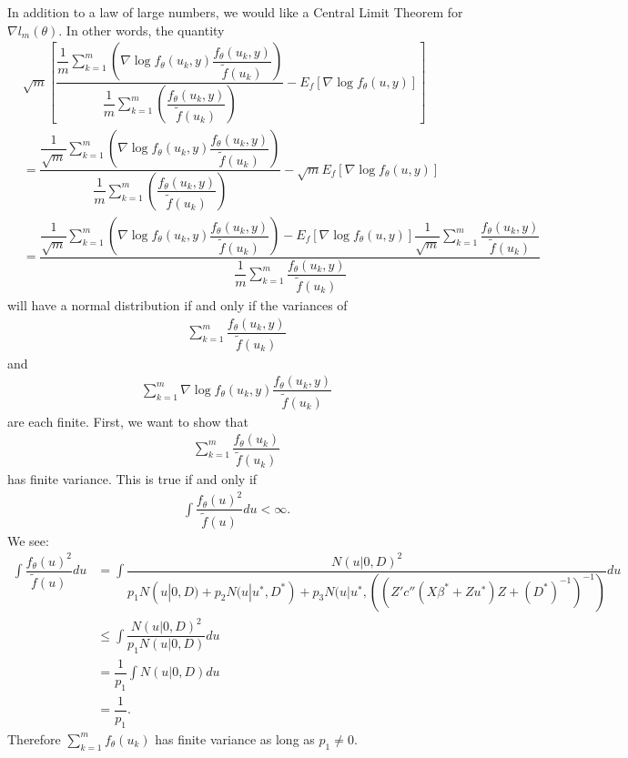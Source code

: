 \documentclass{article}
\begin{document}
In addition to a law of large numbers, we would like a Central Limit Theorem for $\nabla l_m(\theta)$. In other words, the quantity
\begin{align}
&\sqrt{m} \left[  \dfrac{\dfrac{1}{m}\sum_{k=1}^m    \left( \nabla \log f_\theta(u_k,y)   \dfrac{f_\theta(u_k,y)}{\tilde{f}(u_k)} \right)}{\dfrac{1}{m} \sum_{k=1}^m \left( \dfrac{f_\theta(u_k,y)}{\tilde{f}(u_k)} \right) }- E_f \left[ \nabla \log f_\theta(u,y)  \right]  \right] \\
&=
\dfrac{\dfrac{1}{\sqrt{m}}\sum_{k=1}^m    \left( \nabla \log f_\theta(u_k,y)   \dfrac{f_\theta(u_k,y)}{\tilde{f}(u_k)} \right)}{\dfrac{1}{m} \sum_{k=1}^m \left( \dfrac{f_\theta(u_k,y)}{\tilde{f}(u_k)} \right) }- \sqrt{m} E_f \left[ \nabla \log f_\theta(u,y)  \right]  \\
&=\dfrac{\dfrac{1}{\sqrt{m}}\sum_{k=1}^m    \left( \nabla \log f_\theta(u_k,y)\dfrac{f_\theta(u_k,y)}{\tilde{f}(u_k)} \right)
 - E_f \left[ \nabla \log f_\theta(u,y)  \right] \dfrac{1}{\sqrt{m}}\sum_{k=1}^m  \dfrac{f_\theta(u_k,y)}{\tilde{f}(u_k)} }{\dfrac{1}{m} \sum_{k=1}^m  \dfrac{f_\theta(u_k,y)}{\tilde{f}(u_k)} }   
\end{align}
will have a normal distribution if and only if the variances of
\begin{align}
\sum_{k=1}^m  \dfrac{f_\theta(u_k,y)}{\tilde{f}(u_k)}
\end{align}
and
\begin{align}
\sum_{k=1}^m     \nabla \log f_\theta(u_k,y)\dfrac{f_\theta(u_k,y)}{\tilde{f}(u_k)} 
\end{align}
are each finite.
First, we want to show that
\begin{align}
\sum_{k=1}^m \dfrac{f_\theta(u_k)}{\tilde{f}(u_k)}
\end{align}
has finite variance. This is true if and only if 
\begin{align}
\int \dfrac{f_\theta(u)^2}{\tilde{f}(u)} du < \infty.
\end{align}
We see:
\begin{align}
\int \dfrac{f_\theta(u)^2}{\tilde{f}(u)} du &= \int \dfrac{N(u|0,D)^2}{p_1 N(u|0,D)+p_2 N(u|u^*, D^*) + p_3 N(u|u^*, ((Z'  c''(X \beta^*+Zu^*) Z +(D^*)^{-1}   )^{-1})} du \\
& \leq \int \dfrac{N(u|0,D)^2}{p_1 N(u|0,D)} du \\
&= \dfrac{1}{p_1} \int N(u|0,D) du \\
&= \dfrac{1}{p_1}.
\end{align}
Therefore $\sum_{k=1}^m f_\theta(u_k)$ has finite variance as long as $p_1\neq 0$.
\end{document}
